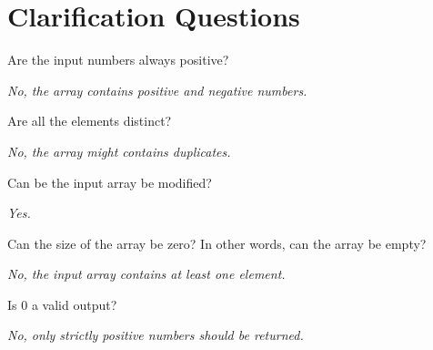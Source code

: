 \section{Clarification Questions}

\begin{QandA}
	\item \begin{questionitem} \begin{question} Are the input numbers always positive?  \end{question} 	 
    \begin{answered}
		\textit{No, the array contains positive and negative numbers.}
	\end{answered} \end{questionitem}

	\item \begin{questionitem} \begin{question} Are all the elements distinct?  \end{question} 	 
    \begin{answered}
		\textit{No, the array might contains duplicates.}
	\end{answered} \end{questionitem}
	
	\item \begin{questionitem} \begin{question} Can be the input array be modified?  \end{question} 	 
    \begin{answered}
		\textit{Yes.}
	\end{answered} \end{questionitem}

	\item \begin{questionitem} \begin{question} Can the size of the array be zero? In other words, can the array be empty?  \end{question} 	 
    \begin{answered}
		\textit{No, the input array contains at least one element.}
	\end{answered} \end{questionitem}

	\item \begin{questionitem} \begin{question} Is $0$ a valid output?  \end{question} 	 
    \begin{answered}
		\textit{No, only strictly positive numbers should be returned.}
	\end{answered} \end{questionitem}

\end{QandA}


